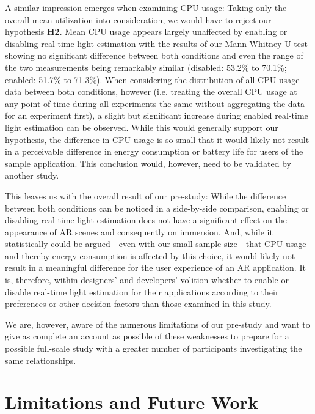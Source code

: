 \documentclass[12pt,twoside,english]{article}
\begin{document}
A similar impression emerges when examining \gls{CPU} usage:
Taking only the overall mean utilization into consideration, we would have to reject our hypothesis \textbf{H2}.
Mean \gls{CPU} usage appears largely unaffected by enabling or disabling real-time light estimation with the results of our Mann-Whitney U-test showing no significant difference between both conditions and even the range of the two measurements being remarkably similar (disabled: 53.2\% to 70.1\%; enabled: 51.7\% to 71.3\%).
When considering the distribution of all \gls{CPU} usage data between both conditions, however (i.e. treating the overall \gls{CPU} usage at any point of time during all experiments the same without aggregating the data for an experiment first), a slight but significant increase during enabled real-time light estimation can be observed.
While this would generally support our hypothesis, the difference in \gls{CPU} usage is so small that it would likely not result in a perceivable difference in energy consumption or battery life for users of the sample application.
This conclusion would, however, need to be validated by another study.

This leaves us with the overall result of our pre-study:
While the difference between both conditions can be noticed in a side-by-side comparison, enabling or disabling real-time light estimation does not have a significant effect on the appearance of \gls{AR} scenes and consequently on immersion.
And, while it statistically could be argued---even with our small sample size---that \gls{CPU} usage and thereby energy consumption is affected by this choice, it would likely not result in a meaningful difference for the user experience of an \gls{AR} application.
It is, therefore, within designers' and developers' volition whether to enable or disable real-time light estimation for their applications according to their preferences or other decision factors than those examined in this study.

We are, however, aware of the numerous limitations of our pre-study and want to give as complete an account as possible of these weaknesses to prepare for a possible full-scale study with a greater number of participants investigating the same relationships.

\section{Limitations and Future Work}
\label{sect:limitations}
\end{document}
